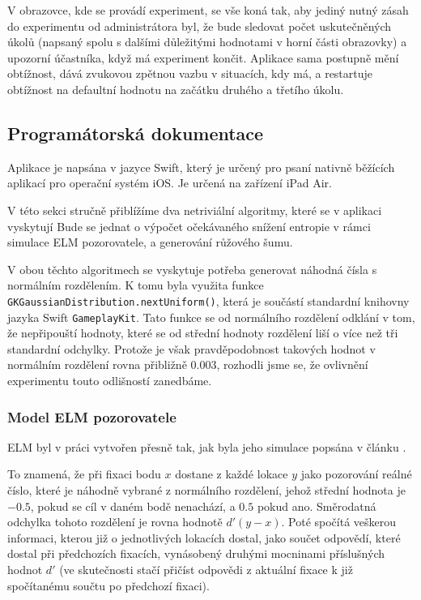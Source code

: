 \bigskip
V obrazovce, kde se provádí experiment, se vše koná tak, aby jediný nutný zásah
do experimentu od administrátora byl, že bude sledovat počet uskutečněných
úkolů (napsaný spolu s dalšími důležitými hodnotami v horní části obrazovky) a
upozorní účastníka, když má experiment končit. Aplikace sama postupně mění
obtížnost, dává zvukovou zpětnou vazbu v situacích, kdy má, a restartuje
obtížnost na defaultní hodnotu na začátku druhého a třetího úkolu.

\subsection*{Programátorská dokumentace}

Aplikace je napsána v jazyce Swift, který je určený pro psaní nativně běžících
aplikací pro operační systém iOS. Je určená na zařízení iPad Air.

V této sekci stručně přiblížíme dva netriviální algoritmy, které se v aplikaci
vyskytují Bude se jednat o výpočet očekávaného snížení entropie v rámci
simulace ELM pozorovatele, a generování růžového šumu.

V obou těchto algoritmech se vyskytuje potřeba generovat náhodná čísla s
normálním rozdělením. K tomu byla využita funkce {\tt
GKGaussianDistribution.nextUniform()}, která je součástí standardní knihovny
jazyka Swift {\tt GameplayKit}. Tato funkce se od normálního rozdělení odklání v tom, že
nepřipouští hodnoty, které se od střední hodnoty rozdělení liší o více než
tři standardní odchylky. Protože je však pravděpodobnost takových hodnot v
normálním rozdělení rovna přibližně $0.003$, rozhodli jsme se, že ovlivnění
experimentu touto odlišností zanedbáme.

\subsubsection*{Model ELM pozorovatele}

ELM  byl v práci vytvořen přesně tak, jak byla jeho simulace popsána v článku \citep{Najemnik09}. 

To znamená, že při fixaci bodu $x$  dostane z každé lokace $y$ jako pozorování reálné
číslo, které je náhodně vybrané z normálního rozdělení, jehož střední hodnota
je $-0.5$, pokud se cíl v daném bodě nenachází, a $0.5$ pokud ano. Směrodatná
odchylka tohoto rozdělení je rovna hodnotě $d'(y-x)$. Poté
spočítá veškerou informaci, kterou již o jednotlivých lokacích dostal, jako
součet odpovědí, které dostal při předchozích fixacích, vynásobený druhými
mocninami příslušných hodnot $d'$ (ve skutečnosti stačí přičíst odpovědi z
aktuální fixace k již spočítanému součtu po předchozí fixaci).

